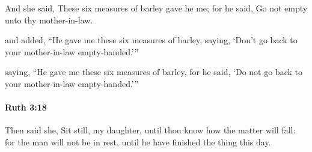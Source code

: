 			\begin{versebox}
					\item[BHS] 
					\item[LXX] 
					\item[ASV] And she said, These six measures of barley gave he me; for he said, Go not empty unto thy mother-in-law.
					\item[NIV] and added, “He gave me these six measures of barley, saying, ‘Don’t go back to your mother-in-law empty-handed.’”
					\item[NRSV] saying, “He gave me these six measures of barley, for he said, ‘Do not go back to your mother-in-law empty-handed.’”
			\end{versebox}

		\paragraph{Ruth 3:18} %
			\label{RUTH-3-18}

			Then said she, Sit still, my daughter, until thou know how the matter will fall: for the man will not be in rest, until he have finished the thing this day.

